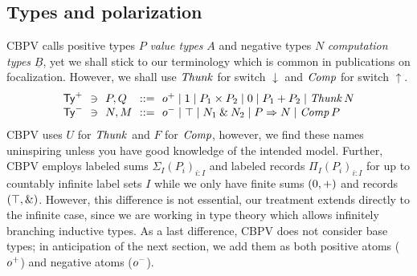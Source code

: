 \documentclass[sigplan,screen]{acmart}
\begin{document}
\subsection{Types and polarization}

CBPV calls positive types $P$ \emph{value types} $A$ and negative
types $N$
\emph{computation types} $\underline B$,
yet we shall stick to our terminology
which is common in publications on focalization.
However, we shall use $\mathit{Thunk}$ for switch $\downarrow$ and $\mathit{Comp}$ for
switch $\uparrow$.
\[
\begin{array}{l@{~~}l@{~~}l@{~~}r@{~~}l}%
  \PTy & \ni & P,Q & ::= & \patom
    \mid \tyone \mid P_1 \times P_2
    \mid \tyzero \mid P_1 + P_2
    \mid \Thunk N
\\
  \NTy & \ni & N,M & ::= & \natom
    \mid \top \mid N_1 \ntimes N_2
    \mid P \To N
    \mid \Comp P
\\
\end{array}
\]
CBPV uses $U$ for $\mathit{Thunk}$ and $F$ for $\mathit{Comp}$, however, we find
these names uninspiring unless you have good knowledge of the intended
model.  Further, CBPV employs labeled sums $\Sigma_I (P_i)_{i : I}$
and labeled records $\Pi_I (P_i)_{i : I}$ for up to countably infinite
label sets $I$ while we only have finite sums $(0,+)$ and
records $(\top,\mathbin{\&})$.  However, this difference is not essential,
our treatment extends directly to the infinite case, since we are
working in type theory which allows infinitely branching inductive
types.   As a last difference, CBPV does not consider base types; in
anticipation of the next section, we add them as both positive atoms
($o^+$) and negative atoms ($o^-$).
\end{document}

